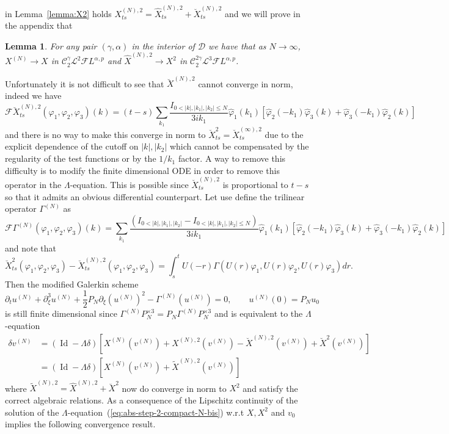 \documentclass[a4paper,11pt,reqno]{article}
\newcommand{\der}{\delta}
\newcommand{\CC}{\mathcal{C}}
\newcommand{\DD}{\mathcal{D}}
\newcommand{\FF}{\mathcal{F}}
\newcommand{\LL}{\mathcal{L}}
\newcommand{\wh}{\widehat}
\DeclareMathOperator{\id}{\text{Id}}
\newtheorem{lemma}[theorem]{Lemma}
\begin{document}
in Lemma~\ref{lemma:X2} holds
$
X^{(N),2}_{ts} = \hat X^{(N),2}_{ts} + \breve X^{(N),2}_{ts}
$
and we will prove in the appendix that 
\begin{lemma}
\label{lemma:gal}
For any pair $(\gamma,\alpha)$ in the interior of $\DD$ we have that as  $N \to \infty$, $X^{(N)} \to X$ in $\CC_2^{\gamma} \LL^2 \FF L^{\alpha,p}$ and $\hat X^{(N),2} \to X^2$ in $\CC_2^{2\gamma} \LL^3 \FF L^{\alpha,p}$. 
\end{lemma}
Unfortunately it is not difficult to see that $\breve X^{(N),2}$ cannot converge in norm, indeed we have
$$
\FF
\breve X^{(N),2}_{ts}(\varphi_1, \varphi_{2}, \varphi_{3})(k) = (t-s) \sum_{k_1} \frac{ I_{0<|k|,|k_1|,|k_2| \le N}}{3 i k_1} \wh \varphi_1 (k_1)[\wh \varphi_{2} (-k_1) \wh \varphi_{3} (k)+\wh \varphi_{3} (-k_1) \wh \varphi_{2} (k)]
$$
and there is no way to make this converge in norm to $\breve X_{ts}^2=\breve X_{ts}^{(\infty),2}$ due to the explicit dependence of the cutoff on $|k|,|k_2|$ which cannot be compensated by the regularity of the test functions or by the $1/k_1$ factor.
A way to remove this difficulty is to modify the finite dimensional ODE in order to remove this operator in the $\Lambda$-equation. This is possible since $\breve X^{(N),2}_{ts} $ is proportional to $t-s$ so that it admits an obvious differential counterpart. Let use define the trilinear operator $\Gamma^{(N)}$ as
$$
\FF \Gamma^{(N)} (\varphi_1, \varphi_{2}, \varphi_3)(k) =  \sum_{k_1} \frac{(I_{0<|k|,|k_1|,|k_2|}- I_{0<|k|,|k_1|,|k_2| \le N})}{3 i k_1} \wh \varphi_1 (k_1)[\wh \varphi_{2} (-k_1) \wh \varphi_{3} (k)+\wh \varphi_{3} (-k_1) \wh \varphi_{2} (k)]
$$
and note that 
$$
\breve X^{2}_{ts}(\varphi_1, \varphi_{2}, \varphi_{3})-\breve X^{(N),2}_{ts}(\varphi_1, \varphi_{2}, \varphi_{3})  = \int_s^t U(-r)\Gamma(U(r)\varphi_1, U(r)\varphi_{2}, U(r)\varphi_{3}) dr .
$$
Then the modified Galerkin scheme 
\begin{equation}
  \label{eq:kdv-real-N-mod}
\partial_t u^{(N)} + \partial^3_\xi u^{(N)} +
\frac12 P_N \partial_\xi (u^{(N)})^2 - \Gamma^{(N)}(u^{(N)})= 0,
\qquad u^{(N)}(0) = P_N u_0
\end{equation}
is still finite dimensional since $\Gamma^{(N)}P_N^{\times 3} = P_N \Gamma^{(N)}P_N^{\times 3}$ and
is equivalent to the $\Lambda$-equation
\begin{equation}
\begin{split}
  \label{eq:abs-step-2-compact-N-bis}
\der v^{(N)} & = (\id - \Lambda \der)[X^{(N)}(v^{(N)})+X^{(N),2}(v^{(N)})
 -\breve X^{(N),2}(v^{(N)})+\breve X^{2}(v^{(N)})]
\\ &= (\id - \Lambda \der)[X^{(N)}(v^{(N)})+\tilde X^{(N),2}(v^{(N)})]
\end{split}
\end{equation}
where $\tilde X^{(N),2} = \hat X^{(N),2} + \breve X^{2}$ now do converge in norm to $X^2$ and satisfy the correct algebraic relations.
As a consequence of the Lipschitz continuity of the solution of the
$\Lambda$-equation~(\ref{eq:abs-step-2-compact-N-bis}) w.r.t $X, X^2$ and $v_0$ implies
the following convergence result.
\end{document}
